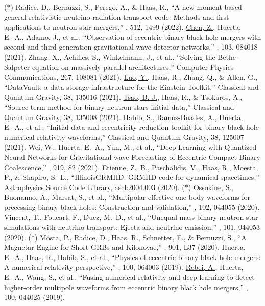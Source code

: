  ($*$) Radice, D., Bernuzzi, S., Perego, A., \& Haas, R., ``A new moment-based general-relativistic neutrino-radiation transport code: Methods and first applications to neutron star mergers,'' \mnras, 512, 1499 (2022).
 \underline{Chen, Z.}, Huerta, E.~A., Adamo, J., et al., ``Observation of eccentric binary black hole mergers with second and third generation gravitational wave detector networks,'' \prd, 103, 084018 (2021).
 Zhang, X., Achilles, S., Winkelmann, J., et al., ``Solving the Bethe-Salpeter equation on massively parallel architectures,'' Computer Physics Communications, 267, 108081 (2021).
 \underline{Luo, Y.}, Haas, R., Zhang, Q., \& Allen, G., ``DataVault: a data storage infrastructure for the Einstein Toolkit,'' Classical and Quantum Gravity, 38, 135016 (2021).
 \underline{Tsao, B.-J.}, Haas, R., \& Tsokaros, A., ``Source term method for binary neutron stars initial data,'' Classical and Quantum Gravity, 38, 135008 (2021).
 \underline{Habib, S.}, Ramos-Buades, A., Huerta, E.~A., et al., ``Initial data and eccentricity reduction toolkit for binary black hole numerical relativity waveforms,'' Classical and Quantum Gravity, 38, 125007 (2021).
 Wei, W., Huerta, E.~A., Yun, M., et al., ``Deep Learning with Quantized Neural Networks for Gravitational-wave Forecasting of Eccentric Compact Binary Coalescence,'' \apj, 919, 82 (2021).
 Etienne, Z.~B., Paschalidis, V., Haas, R., Moesta, P., \& Shapiro, S.~L., ``IllinoisGRMHD: GRMHD code for dynamical spacetimes,'' Astrophysics Source Code Library, ascl:2004.003 (2020).
 ($*$) Ossokine, S., Buonanno, A., Marsat, S., et al., ``Multipolar effective-one-body waveforms for precessing binary black holes: Construction and validation,'' \prd, 102, 044055 (2020).
 Vincent, T., Foucart, F., Duez, M.~D., et al., ``Unequal mass binary neutron star simulations with neutrino transport: Ejecta and neutrino emission,'' \prd, 101, 044053 (2020).
 ($*$) M{\"o}sta, P., Radice, D., Haas, R., Schnetter, E., \& Bernuzzi, S., ``A Magnetar Engine for Short GRBs and Kilonovae,'' \apjl, 901, L37 (2020).
 Huerta, E.~A., Haas, R., Habib, S., et al., ``Physics of eccentric binary black hole mergers: A numerical relativity perspective,'' \prd, 100, 064003 (2019).
 \underline{Rebei, A.}, Huerta, E.~A., Wang, S., et al., ``Fusing numerical relativity and deep learning to detect higher-order multipole waveforms from eccentric binary black hole mergers,'' \prd, 100, 044025 (2019).
